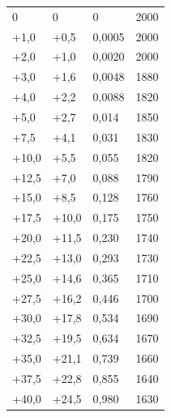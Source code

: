 \documentclass{scrartcl}
\begin{document}
\begin{table}[H]
\begin{center}
\begin{tabular}{l|l|l|l}
0       &   0       &   0       &   2000 \\
+1,0    &   +0,5    &   0,0005  &   2000 \\
+2,0    &   +1,0    &   0,0020  &   2000 \\
+3,0	&	+1,6	&   0,0048  &   1880 \\
+4,0    &   +2,2    &   0,0088  &   1820 \\
+5,0    &   +2,7    &   0,014   &   1850 \\
+7,5    &   +4,1    &   0,031   &   1830 \\
+10,0   &   +5,5    &   0,055   &   1820 \\
+12,5   &   +7,0    &   0,088   &   1790 \\
+15,0   &   +8,5    &   0,128   &   1760 \\
+17,5   &   +10,0   &   0,175   &   1750 \\
+20,0   &   +11,5   &   0,230   &   1740 \\
+22,5   &   +13,0   &   0,293   &   1730 \\
+25,0   &   +14,6   &   0,365   &   1710 \\
+27,5   &   +16,2   &   0,446   &   1700 \\
+30,0   &   +17,8   &   0,534   &   1690 \\
+32,5   &   +19,5   &   0,634   &   1670 \\
+35,0   &   +21,1   &   0,739   &   1660 \\
+37,5   &   +22,8   &   0,855   &   1640 \\
+40,0   &   +24,5   &   0,980   &   1630 
\end{tabular}
\end{center}
\label{tab:Kohlefadenlampe}
\end{table}
\end{document}
